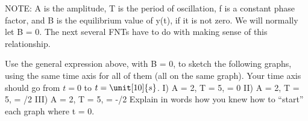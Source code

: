 \label{fnt8.4.2-1}

NOTE: A is the amplitude, T is the period of oscillation, f is a constant phase factor, and B is the equilibrium value of y(t), if it is not zero.  We will normally let B = 0.  The next several FNTs have to do with making sense of this relationship.

Use the general expression above, with B = 0, to sketch the following graphs, using the same time axis for all of them (all on the same graph).  Your time axis should go from $t = 0$ to $t = \unit[10]{s}$.   
I)  A = 2, T = 5, \phi = 0           II)  A = 2, T = 5, \phi = \pi/2          III)  A = 2, T = 5, \phi = -\pi/2
Explain in words how you knew how to ``start'' each graph where t = 0.